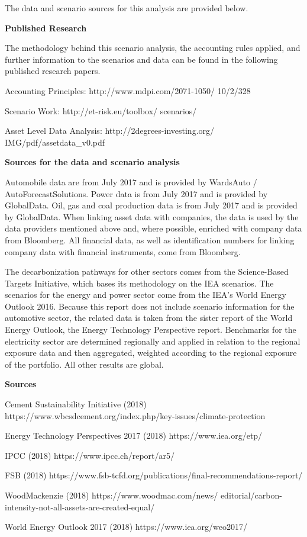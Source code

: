 \documentclass[10pt,table,a4]{article}\usepackage[]{graphicx}\usepackage[]{color}
\begin{document}
	\begin{multicols}{2}
		The data and scenario sources for this analysis are provided below. 
		
		\textbf{Published Research}
		
		The methodology behind this scenario analysis, the accounting rules applied, and further information to the scenarios and data can be found in the following published research papers. 
		
		Accounting Principles: http://www.mdpi.com/2071-1050/ 10/2/328 
		
		Scenario Work: http://et-risk.eu/toolbox/ scenarios/ 
		
		Asset Level Data Analysis: http://2degrees-investing.org/ IMG/pdf/assetdata\_v0.pdf
		
		\textbf{Sources for the data and scenario analysis}
		
		Automobile data are from July 2017 and is provided by WardsAuto / AutoForecastSolutions. Power data is from July 2017 and is provided by GlobalData. Oil, gas and coal production data is from July 2017 and is provided by GlobalData. When linking asset data with companies, the data is used by the data providers mentioned above and, where possible, enriched with company data from Bloomberg. All financial data, as well as identification numbers for linking company data with financial instruments, come from Bloomberg. 
		
		The decarbonization pathways for other sectors comes from the Science-Based Targets Initiative, which bases its methodology on the IEA scenarios. The scenarios for the energy and power sector come from the IEA's World Energy Outlook 2016. Because this report does not include scenario information for the automotive sector, the related data is taken from the sister report of the World Energy Outlook, the Energy Technology Perspective report. Benchmarks for the electricity sector are determined regionally and applied in relation to the regional exposure data and then aggregated, weighted according to the regional exposure of the portfolio. All other results are global.
		
		\textbf{Sources}
		
		Cement Sustainability Initiative (2018) https://www.wbcsdcement.org/index.php/key-issues/climate-protection
		
		Energy Technology Perspectives 2017 (2018) https://www.iea.org/etp/
		
		IPCC (2018) https://www.ipcc.ch/report/ar5/
		
		FSB (2018) https://www.fsb-tcfd.org/publications/final-recommendations-report/
		
		WoodMackenzie (2018) https://www.woodmac.com/news/ editorial/carbon-intensity-not-all-assets-are-created-equal/ 
		
		World Energy Outlook 2017 (2018) https://www.iea.org/weo2017/
	
	\end{multicols}
	
	\newpage
	
	
\end{document}

